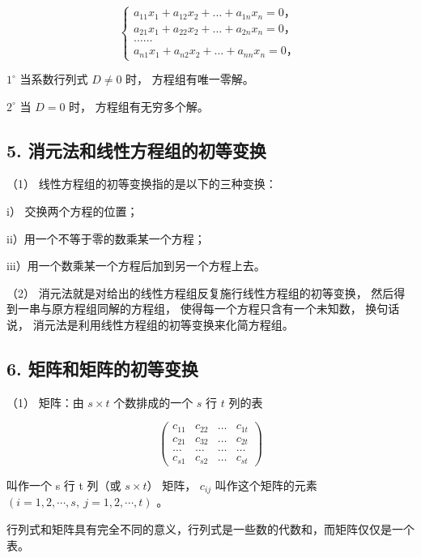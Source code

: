 \[
\left\{ \begin{array}{l} a _ {11} x _ {1} + a _ {12} x _ {2} + \dots + a _ {1 n} x _ {n} = 0\text{，} \\ a _ {21} x _ {1} + a _ {22} x _ {2} + \dots + a _ {2 n} x _ {n} = 0\text{，} \\ \dots \dots \\ a _ {n 1} x _ {1} + a _ {n 2} x _ {2} + \dots + a _ {n n} x _ {n} = 0\text{，} \end{array} \right.
\]

\(1^{\circ}\) 当系数行列式 \(D \neq 0\) 时， 方程组有唯一零解。

\(2^{\circ}\) 当 \(D = 0\) 时， 方程组有无穷多个解。

\subsection{5. 消元法和线性方程组的初等变换}

（1） 线性方程组的初等变换指的是以下的三种变换：

i） 交换两个方程的位置；

ii）用一个不等于零的数乘某一个方程；

iii）用一个数乘某一个方程后加到另一个方程上去。

（2） 消元法就是对给出的线性方程组反复施行线性方程组的初等变换，
然后得到一串与原方程组同解的方程组， 使得每一个方程只含有一个未知数，
换句话说， 消元法是利用线性方程组的初等变换来化简方程组。

\subsection{6. 矩阵和矩阵的初等变换}

（1） 矩阵：由 \(s \times t\) 个数排成的一个 \(s\) 行 \(t\) 列的表

\[
\left( \begin{array}{cccc} c _ {11} & c _ {22} & \dots & c _ {1 t} \\ c _ {21} & c _ {32} & \dots & c _ {2 t} \\ \dots & \dots & \dots & \dots \\ c _ {s 1} & c _ {s 2} & \dots & c _ {s t} \end{array} \right)
\]

叫作一个 s 行 t 列（或 \(s \times t\)） 矩阵， \(c_{ij}\)
叫作这个矩阵的元素 \((i=1,2,\cdots,s,\ j=1,2,\cdots,t)\) 。

行列式和矩阵具有完全不同的意义，行列式是一些数的代数和，而矩阵仅仅是一个表。

